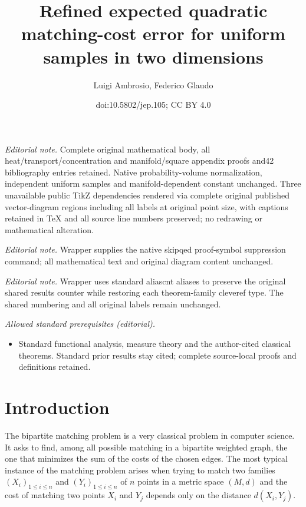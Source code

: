 \documentclass[10pt]{amsart}
\title{Refined expected quadratic matching-cost error for uniform samples in two dimensions}
\author{Luigi Ambrosio, Federico Glaudo}
\date{doi:10.5802/jep.105; CC BY 4.0}
\newcounter{results}[section]
\theoremstyle{plain}
\theoremstyle{definition}
\numberwithin{equation}{section}
\begin{document}
\maketitle
\noindent\textit{Editorial note.} Complete original mathematical body, all heat/transport/concentration and manifold/square appendix proofs and42 bibliography entries retained. Native probability-volume normalization, independent uniform samples and manifold-dependent constant unchanged. Three unavailable public TikZ dependencies rendered via complete original published vector-diagram regions including all labels at original point size, with captions retained in TeX and all source line numbers preserved; no redrawing or mathematical alteration.\par\medskip
\noindent\textit{Editorial note.} Wrapper supplies the native skipqed proof-symbol suppression command; all mathematical text and original diagram content unchanged.\par\medskip
\noindent\textit{Editorial note.} Wrapper uses standard aliascnt aliases to preserve the original shared results counter while restoring each theorem-family cleveref type. The shared numbering and all original labels remain unchanged.\par\medskip
\noindent\textit{Allowed standard prerequisites (editorial).}\begin{itemize}
\item Standard functional analysis, measure theory and the author-cited classical theorems. Standard prior results stay cited; complete source-local proofs and definitions retained.
\end{itemize}\medskip
\vspace*{-\baselineskip}
\tableofcontents


\section{Introduction}
The bipartite matching problem is a very classical problem in computer science. It asks to find, among all
possible matching in a bipartite weighted graph, the one that minimizes the sum of the costs of the chosen
edges. The most typical instance of the matching problem arises when trying to match two families
$(X_i)_{1\le i\le n}$ and $(Y_i)_{1\le i\le n}$ of $n$ points in a metric space $(M, d)$ and the cost of
matching two points $X_i$ and $Y_j$ depends only on the distance $d(X_i, Y_j)$.
\end{document}
